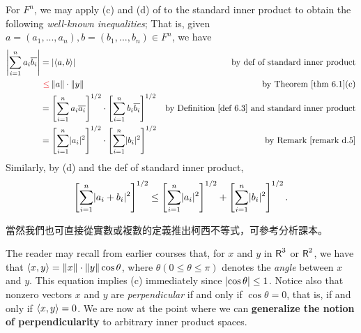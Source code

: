 \begin{example} \label{example 6.1.7}
For \(F^n\), we may apply (c) and (d) of  to the standard inner product to obtain the following \emph{well-known inequalities};
That is, given \(a = (a_1, ..., a_n), b = (b_1, ..., b_n) \in F^n\), we have
\begin{align*}
    \left| \sum_{i = 1}^n a_i \conjugatet{b_i} \right|
        & = \left| \LG a, b \RG \right| & \text{by def of standard inner product} \\
        &\ \RED{\le} \norm{a} \cdot \norm{y} & \text{by \THM{6.1}(c)} \\
        & = \left[ \sum_{i = 1}^n a_i\conjugatet{a_i} \right]^{1/2} \cdot \left[ \sum_{i = 1}^n b_i\conjugatet{b_i} \right]^{1/2} & \text{by \DEF{6.3} and standard inner product} \\
        & = \left[ \sum_{i = 1}^n \abs{a_i}^2 \right]^{1/2} \cdot \left[ \sum_{i = 1}^n \abs{b_i}^2 \right]^{1/2} & \text{by \RMK{d.5}}
\end{align*}
Similarly, by (d) and the def of standard inner product,
\[
    \left[ \sum_{i = 1}^n \lvert a_i + b_i\rvert^2 \right]^{1/2} \le \left[ \sum_{i = 1}^n \lvert a_i\rvert^2 \right]^{1/2} + \left[ \sum_{i = 1}^n \lvert b_i\rvert^2 \right]^{1/2}.
\]
\end{example}

\begin{note}
當然我們也可直接從實數或複數的定義推出柯西不等式，可參考分析課本。
\end{note}

The reader may recall from earlier courses that, for \(x\) and \(y\) in \(\textsf{R}^3\) or \(\textsf{R}^2\), we have that \(\left< x, y \right> = \left\lVert x\right\rVert \cdot \left\lVert y\right\rVert \cos \theta\), where \(\theta (0 \le \theta \le \pi)\) denotes the \emph{angle} between \(x\) and \(y\).
This equation implies (c) immediately since \(\lvert \cos \theta \rvert \le 1\).
Notice also that nonzero vectors \(x\) and \(y\) are \emph{perpendicular} if and only if \(\cos \theta = 0\), that is, if and only if \(\left< x, y \right> = 0\).
We are now at the point where we can \textbf{generalize the notion of perpendicularity} to arbitrary inner product spaces.

